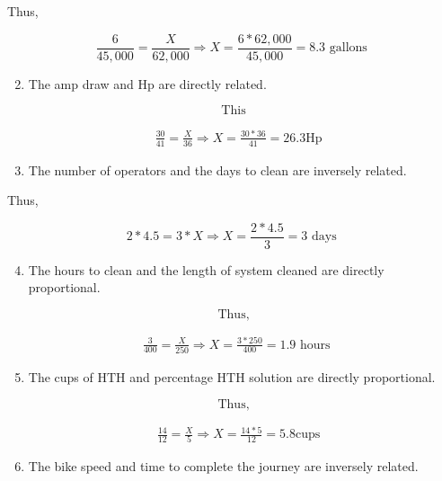 \documentclass[10pt]{article}
\begin{document}
\begin{enumerate}
\begin{enumerate}
Thus,

$$
\frac{6}{45,000}=\frac{X}{62,000} \Longrightarrow X=\frac{6 * 62,000}{45,000}=8.3 \text { gallons }
$$

\begin{enumerate}
  \setcounter{enumi}{1}
  \item The amp draw and Hp are directly related.
\end{enumerate}

$$
\text { This }
$$

$$
\begin{aligned}
& \frac{30}{41}=\frac{X}{36} \Longrightarrow X=\frac{30 * 36}{41}=26.3 \mathrm{Hp}
\end{aligned}
$$

\begin{enumerate}
  \setcounter{enumi}{2}
  \item The number of operators and the days to clean are inversely related.
\end{enumerate}

Thus,

$$
2 * 4.5=3 * X \Longrightarrow X=\frac{2 * 4.5}{3}=3 \text { days }
$$

\begin{enumerate}
  \setcounter{enumi}{3}
  \item The hours to clean and the length of system cleaned are directly proportional.
\end{enumerate}

$$
\text { Thus, }
$$

$$
\begin{aligned}
& \frac{3}{400}=\frac{X}{250} \Longrightarrow X=\frac{3 * 250}{400}=1.9 \text { hours }
\end{aligned}
$$

\begin{enumerate}
  \setcounter{enumi}{4}
  \item The cups of $\mathrm{HTH}$ and percentage $\mathrm{HTH}$ solution are directly proportional.
\end{enumerate}

$$
\text { Thus, }
$$

$$
\begin{aligned}
& \frac{14}{12}=\frac{X}{5} \Longrightarrow X=\frac{14 * 5}{12}=5.8 \mathrm{cups}
\end{aligned}
$$

\begin{enumerate}
  \setcounter{enumi}{5}
  \item The bike speed and time to complete the journey are inversely related.
\end{enumerate}


\end{enumerate}
\end{enumerate}
\end{document}
